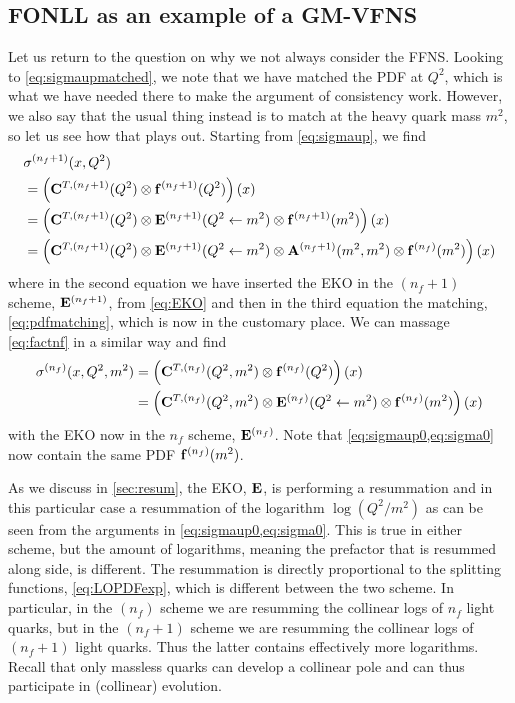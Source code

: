 \subsection{FONLL as an example of a GM-VFNS}

Let us return to the question on why we not always consider the FFNS.
Looking to \cref{eq:sigmaupmatched}, we note that we have matched the PDF at $Q^2$, which is what we have needed there to make the argument of consistency work.
However, we also say that the usual thing instead is to match at the heavy quark mass $m^2$, so let us see how that plays out.
Starting from \cref{eq:sigmaup}, we find
\begin{align}
    &\sigma^{(n_f+1)}(x,Q^2) \nonumber\\
    &= \left(\vb C^{T,(n_f+1)}(Q^2) \otimes \vb f^{(n_f+1)}(Q^2)\right)(x)\\
    &= \left(\vb C^{T,(n_f+1)}(Q^2) \otimes \vb E^{(n_f+1)}(Q^2 \leftarrow m^2) \otimes \vb f^{(n_f+1)}(m^2)\right)(x)\\
    &= \left(\vb C^{T,(n_f+1)}(Q^2) \otimes \vb E^{(n_f+1)}(Q^2 \leftarrow m^2) \otimes \vb A^{(n_f+1)}(m^2,m^2) \otimes \vb f^{(n_f)}(m^2)\right)(x) \label{eq:sigmaup0}
\end{align}
where in the second equation we have inserted the EKO in the $(n_f+1)$ scheme, $\vb E^{(n_f+1)}$, from \cref{eq:EKO} and then in the third equation the matching, \cref{eq:pdfmatching}, which is now in the customary place.
We can massage \cref{eq:factnf} in a similar way and find
\begin{align}
    \sigma^{(n_f)}(x,Q^2,m^2) &= \left(\vb C^{T,(n_f)}(Q^2,m^2) \otimes \vb f^{(n_f)}(Q^2)\right)(x)\\
    &= \left(\vb C^{T,(n_f)}(Q^2,m^2) \otimes \vb E^{(n_f)}(Q^2 \leftarrow m^2) \otimes \vb f^{(n_f)}(m^2)\right)(x) \label{eq:sigma0}
\end{align}
with the EKO now in the $n_f$ scheme, $\vb E^{(n_f)}$.
Note that \cref{eq:sigmaup0,eq:sigma0} now contain the same PDF $\vb f^{(n_f)}(m^2)$.

As we discuss in \cref{sec:resum}, the EKO, $\vb E$, is performing a resummation and in this particular case a resummation of the logarithm $\log(Q^2/m^2)$ as can be seen from the arguments in \cref{eq:sigmaup0,eq:sigma0}.
This is true in either scheme, but the amount of logarithms, meaning the prefactor that is resummed along side, is different.
The resummation is directly proportional to the splitting functions, \cref{eq:LOPDFexp}, which is different between the two scheme.
In particular, in the $(n_f)$ scheme we are resumming the collinear logs of $n_f$ light quarks, but in the $(n_f+1)$ scheme we are resumming the collinear logs of $(n_f+1)$ light quarks.
Thus the latter contains effectively more logarithms.
Recall that only massless quarks can develop a collinear pole and can thus participate in (collinear) evolution.

